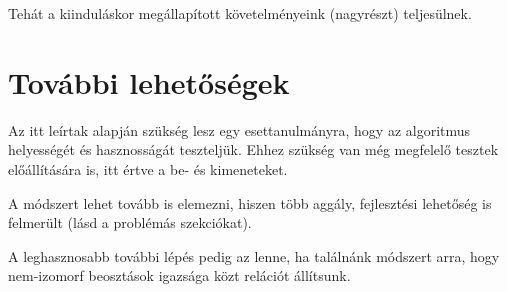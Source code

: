 \documentclass[twocolumn]{article}
\theoremstyle{definition}
\newcommand{\subin}[1]{ {#1}_{\text{in}} }
\newcommand{\subout}[1]{ {#1}_{\text{out}} }
\begin{document}
    Tehát a kiinduláskor megállapított követelményeink (nagyrészt) teljesülnek.
    
\section{További lehetőségek}

    Az itt leírtak alapján szükség lesz egy esettanulmányra, hogy az algoritmus helyességét és hasznosságát teszteljük. Ehhez szükség van még megfelelő tesztek előállítására is, itt értve a be- és kimeneteket.
    
    A módszert lehet tovább is elemezni, hiszen több aggály, fejlesztési lehetőség is felmerült (lásd a problémás szekciókat).
    
    A leghasznosabb további lépés pedig az lenne, ha találnánk módszert arra, hogy nem-izomorf beosztások igazsága közt relációt állítsunk.
    
    \iffalse
    
    \begin{equation*}
        f(S) = 1 -
        \frac{\sum\limits_{e \in E_S} \sum\limits_{x \sim y} 
                \left|
                \sqrt{\sum\limits_{i=1}^{|e|}(\nu_i(\subin x) - \nu_i(\subin y))^2} 
                - \sqrt{\sum\limits_{i=1}^{|e|}(\nu_i(\subout x) - \nu_i(\subout y))^2} 
                \right|
            }
        {\sum\limits_{e \in E_S} \binom{|G(e)|}{2} \hat{\delta}_e}
    \end{equation*}
    
    \begin{equation*}
        \nu(u) = \frac{u - \check u}{\hat u - \check u}
    \end{equation*}
    \begin{equation*}
        d_e(x, y) = \sqrt{\sum\limits_{i=1}^{|e|}(x - y)^2} 
    \end{equation*}
    
    \fi
    
\end{document}
